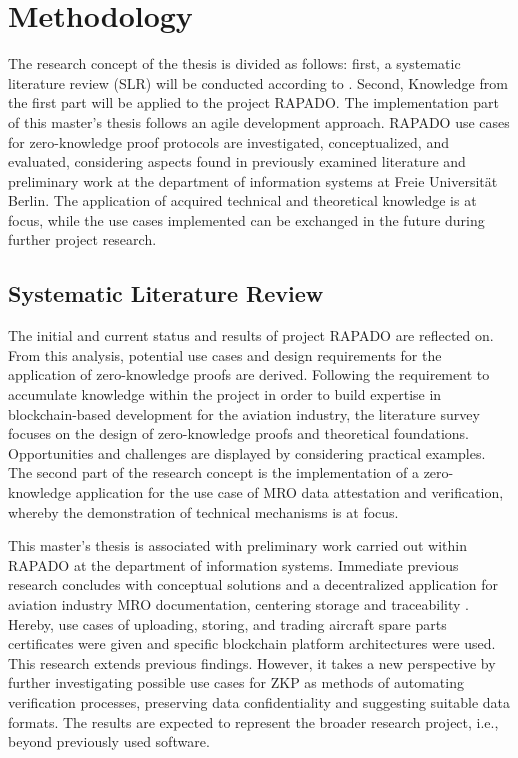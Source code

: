 \chapter{Methodology}
The research concept of the thesis is divided as follows: first, a systematic literature review (SLR) will be conducted according to \cite{HevnerAR2004DSiI, vomBrockeJan2019TDgs, Webster2002AnalyzingTP}. Second, Knowledge from the first part will be applied to the project RAPADO. The implementation part of this master's thesis follows an agile development approach. RAPADO use cases for zero-knowledge proof protocols are investigated, conceptualized, and evaluated, considering aspects found in previously examined literature and preliminary work at the department of information systems at Freie Universit{\"a}t Berlin. The application of acquired technical and theoretical knowledge is at focus, while the use cases implemented can be exchanged in the future during further project research. 

\section{Systematic Literature Review}
The initial and current status and results of project RAPADO are reflected on. From this analysis, potential use cases and design requirements for the application of zero-knowledge proofs are derived. Following the requirement to accumulate knowledge within the project in order to build expertise in blockchain-based development for the aviation industry, the literature survey focuses on the design of zero-knowledge proofs and theoretical foundations. Opportunities and challenges are displayed by considering practical examples. The second part of the research concept is the implementation of a zero-knowledge application for the use case of MRO data attestation and verification, whereby the demonstration of technical mechanisms is at focus.

This master's thesis is associated with preliminary work carried out within RAPADO at the department of information systems. Immediate previous research concludes with conceptual solutions and a decentralized application for aviation industry MRO documentation, centering storage and traceability \citep{ZedelJ, semesterproject}. Hereby, use cases of uploading, storing, and trading aircraft spare parts certificates were given and specific blockchain platform architectures were used. This research extends previous findings. However, it takes a new perspective by further investigating possible use cases for ZKP as methods of automating verification processes, preserving data confidentiality and suggesting suitable data formats. The results are expected to represent the broader research project, i.e., beyond previously used software.


